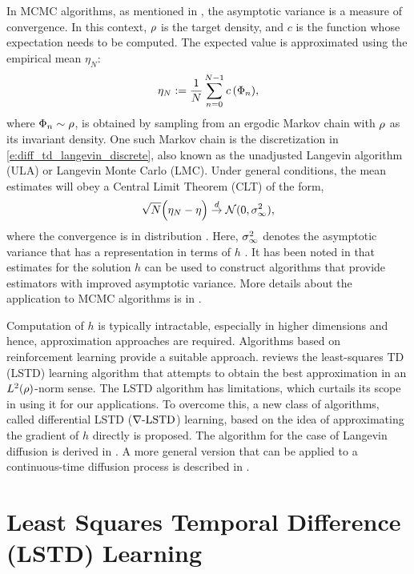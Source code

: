 In MCMC algorithms, as mentioned in , the asymptotic variance is a measure of convergence. In this context, $\rho$ is the target density, and $c$ is the function whose expectation needs to be computed. The expected value is approximated using the empirical mean $\eta_N$:
\begin{equation} \eta_N := \frac{1}{N} \sum_{n=0}^{N-1} c\,(\Phi_n),\end{equation}
where $\Phi_n \sim \rho$, is obtained by sampling from an ergodic Markov chain with $\rho$ as its invariant density. One such Markov chain is the discretization in \eqref{e:diff_td_langevin_discrete}, also known as the unadjusted Langevin algorithm (ULA) or Langevin Monte Carlo (LMC). Under general conditions, the mean estimates will obey a Central Limit Theorem (CLT) of the form,
\begin{equation}
\sqrt{N} \Bigl( \eta_N - \eta \Bigr) \overset{d}{\to} \mathcal{N}(0,\sigma^2_\infty),
\end{equation}
where the convergence is in distribution \cite{MT,bha82}. Here, $\sigma^2_\infty$ denotes the asymptotic variance that has a representation in terms of $h$ \cite{glymey96a,MT,asmgly07}. It has been noted in \cite{henthesis97, delkon12} that estimates for the solution $h$ can be used to construct algorithms that provide estimators with improved asymptotic variance. More details about the application to MCMC algorithms is in . 

Computation of $h$ is typically intractable, especially in higher dimensions and hence, approximation approaches are required. Algorithms based on reinforcement learning provide a suitable approach.  reviews the least-squares TD (LSTD) learning algorithm that attempts to obtain the best approximation in an $L^2(\rho)$-norm sense. The LSTD algorithm has limitations, which curtails its scope in using it for our applications. To overcome this, a new class of algorithms, called differential LSTD ($\nabla\text{-LSTD}$) learning, based on the idea of approximating the gradient of $h$ directly is proposed. The algorithm for the case of Langevin diffusion is derived in .  A more general version that can be applied to a continuous-time diffusion process is described in . 

\section{Least Squares Temporal Difference (LSTD) Learning} 
\label{s:lstd}
